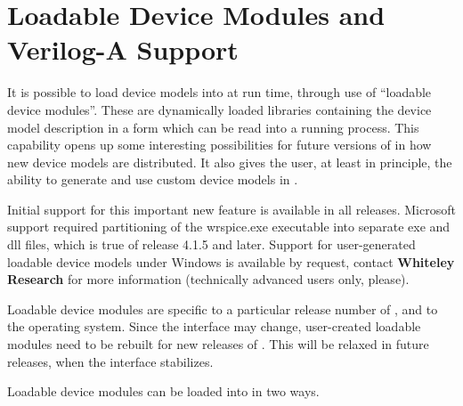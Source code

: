  
\section{Loadable Device Modules and Verilog-A Support}
\label{loadable}


It is possible to load device models into {\WRspice} at run time,
through use of ``loadable device modules''.  These are dynamically
loaded libraries containing the device model description in a form
which can be read into a running {\WRspice} process.  This capability
opens up some interesting possibilities for future versions of
{\WRspice} in how new device models are distributed.  It also gives
the user, at least in principle, the ability to generate and use
custom device models in {\WRspice}.

Initial support for this important new feature is available in all
releases.  Microsoft support required partitioning of the {\vt
wrspice.exe} executable into separate {\vt exe} and {\vt dll} files,
which is true of {\WRspice} release 4.1.5 and later.  Support for
user-generated loadable device models under Windows is available by
request, contact {\bf Whiteley Research} for more information
(technically advanced users only, please). 

Loadable device modules are specific to a particular release number of
{\WRspice}, and to the operating system.  Since the interface may
change, user-created loadable modules need to be rebuilt for new
releases of {\WRspice}.  This will be relaxed in future releases, when
the interface stabilizes.

Loadable device modules can be loaded into {\WRspice} in two ways.

